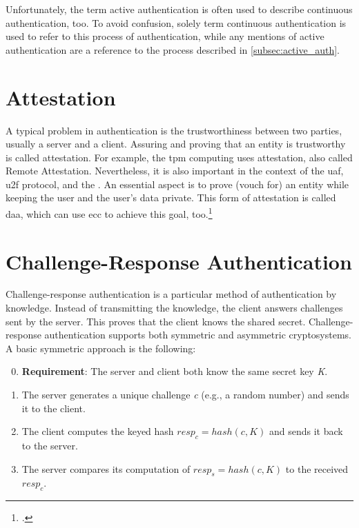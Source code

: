 Unfortunately, the term active authentication is often used to describe continuous authentication, too. To avoid confusion, solely term continuous authentication is used to refer to this process of authentication, while any mentions of active authentication are a reference to the process described in \autoref{subsec:active_auth}.

\section{Attestation}

A typical problem in authentication is the trustworthiness between two parties, usually a server and a client. Assuring and proving that an entity is trustworthy is called attestation. For example, the \gls{tpm} computing uses attestation, also called \frqq Remote Attestation\flqq. Nevertheless, it is also important in the context of the \gls{uaf}, \gls{u2f} protocol, and the \wa. An essential aspect is to prove (\frqq vouch for\flqq) an entity while keeping the user and the user's data private. This form of attestation is called \gls{daa}, which can use \gls{ecc} to achieve this goal, too.\footcites[See][]{trusted-comp}[See][501]{Mayes2017}[See][4]{Coker:2011:PRA:1989153.1989155}[See][100]{2178405}[See][226]{10.1007/978-3-642-12510-2_16}

\section{Challenge-Response Authentication}

Challenge-response authentication is a particular method of authentication by knowledge. Instead of transmitting the knowledge, the client answers challenges sent by the server. This proves that the client knows the shared secret. Challenge-response authentication supports both symmetric and asymmetric cryptosystems. A basic symmetric approach is the following:

\begin{enumerate}
	\setcounter{enumi}{-1} 
	\item \textbf{Requirement}: The server and client both know the same secret key \textit{K}.
	\item The server generates a unique challenge \textit{c} (e.g., a random number) and sends it to the client.
	\item The client computes the keyed hash \(resp_c = hash(c, K)\) and sends it back to the server.
	\item The server compares its computation of \(resp_s = hash(c, K)\) to the received \textit{\(resp_c\)}.
\end{enumerate}

